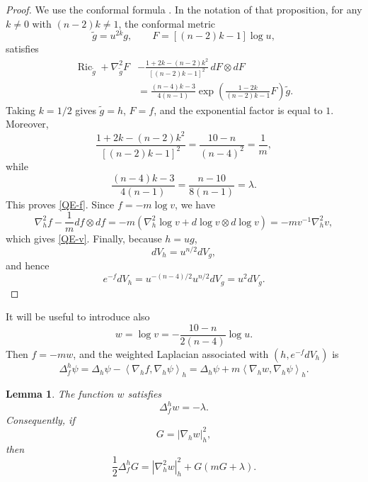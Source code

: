 \documentclass[11pt]{amsart}
\numberwithin{equation}{section}
\newtheorem{lemma}[theorem]{Lemma}
\DeclareMathOperator{\Ric}{Ric}
\newcommand{\Hess}{\nabla^2}
\newcommand{\ip}[2]{\left\langle #1,#2\right\rangle}
\newcommand{\norm}[1]{\left|#1\right|}
\begin{document}
\begin{proof}
We use the conformal formula \cite[Proposition~2.1]{CMM2026}.  In the notation of that proposition, for any $k\neq0$ with $(n-2)k\neq1$, the conformal metric
$$
        \widetilde g=u^{2k}g,
        \qquad
        F=[(n-2)k-1]\log u,
$$
satisfies
\begin{align*}
\Ric_{\widetilde g}+\Hess_{\widetilde g}F
&-\frac{1+2k-(n-2)k^2}{[(n-2)k-1]^2}\,dF\otimes dF  \\
&=\frac{(n-4)k-3}{4(n-1)}
  \exp\!\left(\frac{1-2k}{(n-2)k-1}F\right)\widetilde g .
\end{align*}
Taking $k=1/2$ gives $\widetilde g=h$, $F=f$, and the exponential factor is equal to $1$.  Moreover,
$$
        \frac{1+2k-(n-2)k^2}{[(n-2)k-1]^2}
        =\frac{10-n}{(n-4)^2}=\frac1m,
$$
while
$$
        \frac{(n-4)k-3}{4(n-1)}=\frac{n-10}{8(n-1)}=\lambda .
$$
This proves \eqref{QE-f}.  Since $f=-m\log v$, we have
$$
        \Hess_h f-\frac1m df\otimes df
        =-m\left(\Hess_h\log v+d\log v\otimes d\log v\right)
        =-m v^{-1}\Hess_h v,
$$
which gives \eqref{QE-v}.  Finally, because $h=ug$,
$$
        dV_h=u^{n/2}dV_g,
$$
and hence
$$
        e^{-f}dV_h=u^{-(n-4)/2}u^{n/2}dV_g=u^2dV_g .
$$
\end{proof}

It will be useful to introduce also
\begin{equation}\label{wdef}
        w=\log v=-\frac{10-n}{2(n-4)}\log u .
\end{equation}
Then $f=-mw$, and the weighted Laplacian associated with $(h,e^{-f}dV_h)$ is
\begin{equation}\label{Delf}
        \Delta_f^h \psi=\Delta_h\psi-\ip{\nabla_h f}{\nabla_h\psi}_h
        =\Delta_h\psi+m\ip{\nabla_h w}{\nabla_h\psi}_h .
\end{equation}

\begin{lemma}\label{lem:Delfw}
The function $w$ satisfies
\begin{equation}\label{Delfw}
        \Delta_f^h w=-\lambda .
\end{equation}
Consequently, if
$$
        G=\norm{\nabla_h w}_h^2,
$$
then
\begin{equation}\label{BochnerG}
        \frac12\Delta_f^h G
        =\norm{\Hess_h w}_h^2+G(mG+\lambda).
\end{equation}
\end{lemma}
\end{document}
